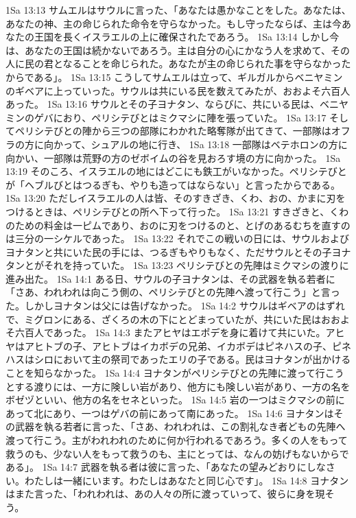 1Sa 13:13  サムエルはサウルに言った、「あなたは愚かなことをした。あなたは、あなたの神、主の命じられた命令を守らなかった。もし守ったならば、主は今あなたの王国を長くイスラエルの上に確保されたであろう。
1Sa 13:14  しかし今は、あなたの王国は続かないであろう。主は自分の心にかなう人を求めて、その人に民の君となることを命じられた。あなたが主の命じられた事を守らなかったからである」。
1Sa 13:15  こうしてサムエルは立って、ギルガルからベニヤミンのギベアに上っていった。サウルは共にいる民を数えてみたが、おおよそ六百人あった。
1Sa 13:16  サウルとその子ヨナタン、ならびに、共にいる民は、ベニヤミンのゲバにおり、ペリシテびとはミクマシに陣を張っていた。
1Sa 13:17  そしてペリシテびとの陣から三つの部隊にわかれた略奪隊が出てきて、一部隊はオフラの方に向かって、シュアルの地に行き、
1Sa 13:18  一部隊はベテホロンの方に向かい、一部隊は荒野の方のゼボイムの谷を見おろす境の方に向かった。
1Sa 13:19  そのころ、イスラエルの地にはどこにも鉄工がいなかった。ペリシテびとが「ヘブルびとはつるぎも、やりも造ってはならない」と言ったからである。
1Sa 13:20  ただしイスラエルの人は皆、そのすきざき、くわ、おの、かまに刃をつけるときは、ペリシテびとの所へ下って行った。
1Sa 13:21  すきざきと、くわのための料金は一ピムであり、おのに刃をつけるのと、とげのあるむちを直すのは三分の一シケルであった。
1Sa 13:22  それでこの戦いの日には、サウルおよびヨナタンと共にいた民の手には、つるぎもやりもなく、ただサウルとその子ヨナタンとがそれを持っていた。
1Sa 13:23  ペリシテびとの先陣はミクマシの渡りに進み出た。
1Sa 14:1  ある日、サウルの子ヨナタンは、その武器を執る若者に「さあ、われわれは向こう側の、ペリシテびとの先陣へ渡って行こう」と言った。しかしヨナタンは父には告げなかった。
1Sa 14:2  サウルはギベアのはずれで、ミグロンにある、ざくろの木の下にとどまっていたが、共にいた民はおおよそ六百人であった。
1Sa 14:3  またアヒヤはエポデを身に着けて共にいた。アヒヤはアヒトブの子、アヒトブはイカボデの兄弟、イカボデはピネハスの子、ピネハスはシロにおいて主の祭司であったエリの子である。民はヨナタンが出かけることを知らなかった。
1Sa 14:4  ヨナタンがペリシテびとの先陣に渡って行こうとする渡りには、一方に険しい岩があり、他方にも険しい岩があり、一方の名をボゼヅといい、他方の名をセネといった。
1Sa 14:5  岩の一つはミクマシの前にあって北にあり、一つはゲバの前にあって南にあった。
1Sa 14:6  ヨナタンはその武器を執る若者に言った、「さあ、われわれは、この割礼なき者どもの先陣へ渡って行こう。主がわれわれのために何か行われるであろう。多くの人をもって救うのも、少ない人をもって救うのも、主にとっては、なんの妨げもないからである」。
1Sa 14:7  武器を執る者は彼に言った、「あなたの望みどおりにしなさい。わたしは一緒にいます。わたしはあなたと同じ心です」。
1Sa 14:8  ヨナタンはまた言った、「われわれは、あの人々の所に渡っていって、彼らに身を現そう。
